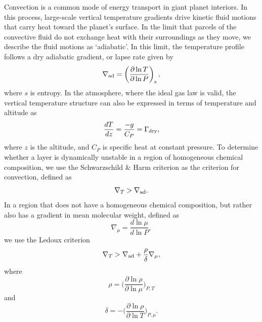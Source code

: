 \documentclass[11pt]{ucscthesisbs}
\begin{document}
Convection is a common mode of energy transport in giant planet interiors. In this process, large-scale vertical temperature gradients drive kinetic fluid motions that carry heat toward the planet's surface. In the limit that parcels of the convective fluid do not exchange heat with their surroundings as they move, we describe the fluid motions as `adiabatic'. In this limit, the temperature profile follows a dry adiabatic gradient, or lapse rate \citep{kippenhahn_2012} given by
\begin{equation}
  \nabla_{\rm ad} = \left( \frac{\partial \ln T}{\partial \ln P} \right)_{\rm s},
\end{equation}
where $s$ is entropy. In the atmosphere, where the ideal gas law is valid, the vertical temperature structure can also be expressed in terms of temperature and altitude \citep{sanchez-lavega} as
\begin{equation}
  \frac{dT}{dz} = \frac{-g}{C_{P}} = \Gamma_{\rm dry},
\end{equation}
where $z$ is the altitude, and $C_{P}$ is specific heat at constant pressure. To determine whether a layer is dynamically unstable in a region of homogeneous chemical composition, we use the Schwarzschild \& Harm criterion \citep{kippenhahn_2012} as the criterion for convection, defined as
 \begin{equation}
  \nabla_{T} > \nabla_{\rm ad}.
\end{equation}
In a region that does not have a homogeneous chemical composition, but rather also has a gradient in mean molecular weight, defined as
 \begin{equation}
 \nabla_{\mu} = \frac{d \ln \mu}{d \ln P}, 
\end{equation}
 we use the Ledoux criterion\citep{kippenhahn_2012}
\begin{equation}
  \nabla_{T} > \nabla_{\rm ad} + \frac{\rho}{\delta}\nabla_{\mu},
  \label{eq:ledoux}
\end{equation}
where
\begin{equation}
  \rho = \bigg(\frac{\partial \ln \rho}{\partial \ln \mu}\bigg)_{P,T}
\end{equation}
and
\begin{equation}
 \delta = -\bigg(\frac{\partial \ln \rho}{\partial \ln T}\bigg)_{P,\mu}.
\end{equation}
\end{document}
